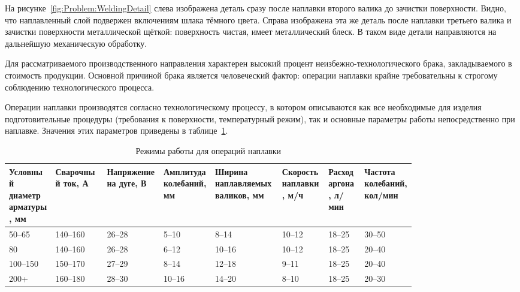 На рисунке~\ref{fig:Problem:WeldingDetail} слева изображена деталь сразу после наплавки второго валика до зачистки поверхности.
Видно, что наплавленный слой подвержен включениям шлака тёмного цвета.
Справа изображена эта же деталь после наплавки третьего валика и зачистки поверхности металлической щёткой: поверхность чистая, имеет металлический блеск.
В таком виде детали направляются на дальнейшую механическую обработку.

Для рассматриваемого производственного направления характерен высокий процент неизбежно-технологического брака, закладываемого в стоимость продукции.
Основной причиной брака является человеческий фактор: операции наплавки крайне требовательны к строгому соблюдению технологического процесса.

Операции наплавки производятся согласно технологическому процессу, в котором описываются как все необходимые для изделия подготовительные процедуры (требования к поверхности, температурный режим), так и основные параметры работы непосредственно при наплавке.
Значения этих параметров приведены в таблице~\ref{tab:WeldingParameters}.

\begin{table}[H]
    \footnotesize
    \caption{Режимы работы для операций наплавки}
    \label{tab:WeldingParameters}
    \begin{tabular}{|p{0.09\linewidth}|p{0.1\linewidth}|p{0.11\linewidth}|p{0.1\linewidth}|p{0.13\linewidth}|p{0.09\linewidth}|p{0.07\linewidth}|p{0.1\linewidth}|}
        \hline
        Условный диаметр арматуры, мм & Сварочный ток, А & Напряжение на дуге, В & Амплитуда колебаний, мм & Ширина наплавляемых валиков, мм & Скорость наплавки, м/ч & Расход аргона, л/мин & Частота колебаний, кол/мин \\ \hline
        50--65                        & 140--160         & 26--28                & 5--10                   & 8--14                           & 10--12                 & 18--25               & 30--50                     \\ \hline
        80                            & 140--160         & 26--28                & 6--12                   & 10--16                          & 10--12                 & 18--25               & 20--40                     \\ \hline
        100--150                      & 150--170         & 27--29                & 8--14                   & 12--18                          & 9--11                  & 18--25               & 20--40                     \\ \hline
        200+                          & 160--180         & 28--30                & 10--16                  & 14--20                          & 8--10                  & 18--25               & 20--30                     \\ \hline
    \end{tabular}
\end{table}

